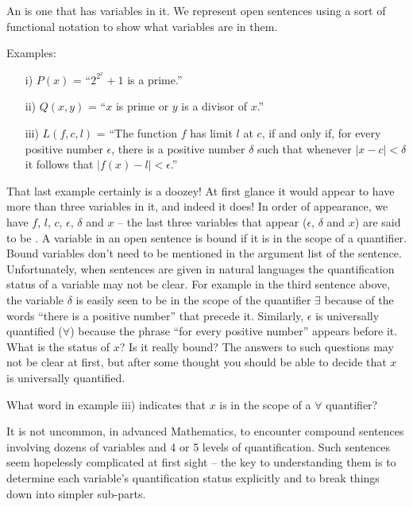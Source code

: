 An  
is one that has variables in it.  We represent 
open sentences using a sort of functional notation to show what
variables are in them.  

Examples:

\begin{enumerate}

\item[i)] $P(x)$ = ``$2^{2^x}+1$ is a prime.''

\item[ii)] $Q(x,y)$ = ``$x$ is prime or $y$ is a divisor of $x$.''

\item[iii)] $L(f,c,l)$ = ``The function $f$ has limit $l$ at $c$, if 
and only if, 
for every positive number $\epsilon$, there is a positive number $\delta$ 
such that whenever $|x-c| < \delta$ it follows that $|f(x)-l| < \epsilon$.''  
\end{enumerate}

That last example certainly is a doozey!  At first glance it would appear
to have more than three variables in it, and indeed it does!  In order of
appearance, we have $f$, $l$, $c$, $\epsilon$, $\delta$ and $x$ -- the 
last three variables that appear ($\epsilon$, $\delta$ and $x$) are said
to be .  
A variable in an open sentence is bound if it is in the
scope of a quantifier.  Bound variables don't need to be mentioned
in the argument list of the sentence.  Unfortunately, when sentences are
given in natural languages the quantification status of a variable may 
not be clear.  For example in the third sentence above, the variable $\delta$
is easily seen to be in the scope of the quantifier $\exists$ because of the
words ``there is a positive number'' that precede it.  Similarly, $\epsilon$
is universally quantified ($\forall$) because the phrase ``for every positive
number'' appears before it.  What is the status of $x$?  Is it really bound?
The answers to such questions may not be clear at first, but after some 
thought you should be able to decide that $x$ is universally quantified.

\begin{exer} What word in example iii) indicates that $x$ is in the
scope of a $\forall$ quantifier?
\end{exer}

It is not uncommon, in advanced Mathematics, to encounter compound sentences
involving dozens of variables and 4 or 5 levels of quantification.  Such 
sentences seem hopelessly complicated at first sight -- the key to 
understanding them is to determine each variable's quantification status
explicitly and to break things down into simpler sub-parts.  

